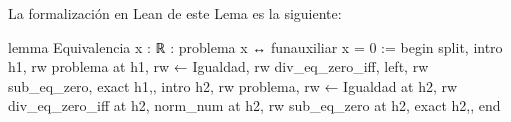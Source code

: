 La formalización en Lean de este Lema es la siguiente:
\begin{leancode}
lemma Equivalencia {x : ℝ} : problema x ↔ funauxiliar x = 0 :=
begin
  split,
  {intro h1,
  rw problema at h1,
  rw ← Igualdad,
  rw div_eq_zero_iff,
  left,
  rw sub_eq_zero,
  exact h1,},
  {intro h2,
  rw problema,
  rw ← Igualdad at h2,
  rw div_eq_zero_iff at h2,
  norm_num at h2,
  rw sub_eq_zero at h2,
  exact h2,},
end
\end{leancode}
